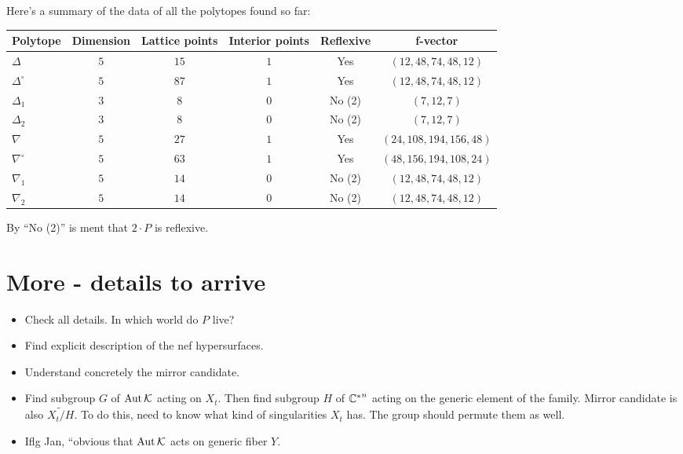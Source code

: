 \documentclass[11pt, english]{article}
\begin{document}
Here's a summary of the data of all the polytopes found so far:


\begin{center}
  \begin{tabular}{l| c c c c c}
Polytope & Dimension & Lattice points & Interior points & Reflexive & f-vector \\
\hline 
$\Delta$ & $5$ & $15$ & $1$ & Yes & $(12, 48, 74, 48, 12)$ \\
$\Delta^\circ$ & $5$ & $87$ & $1$ & Yes & $(12, 48, 74, 48, 12)$ \\
$\Delta_1$ & $3$ & $8$ & $0$ & No (2) & $(7, 12, 7)$ \\
$\Delta_2$ & $3$ & $8$ & $0$ & No (2) & $(7, 12, 7)$ \\
$\nabla$ & $5$ & $27$ & $1$ & Yes & $(24, 108, 194, 156, 48)$ \\
$\nabla^\circ$ & $5$ & $63$ & $1$ & Yes & $(48, 156, 194, 108, 24)$ \\
$\nabla_1$ & $5$ & $14$ & $0$ & No (2)& $(12, 48, 74, 48, 12)$ \\
$\nabla_2$ & $5$ & $14$ & $0$ & No (2)& $(12, 48, 74, 48, 12)$ \\
\end{tabular} 
\end{center} 
By ``No (2)'' is ment that $2 \cdot P$ is reflexive. 

\section{More - details to arrive}

\begin{itemize}
\item Check all details. In which world do $P$ live?
\item Find explicit description of the nef hypersurfaces.
\item Understand concretely the mirror candidate. 
\item Find subgroup $G$ of $\operatorname{Aut} \mathcal K$ acting on $X_t$. Then find subgroup $H$ of ${\mathbb{C}^\ast} ^n$ acting on the generic element of the family. Mirror candidate is also $\tilde{X_t/H}$. To do this, need to know what kind of singularities $X_t$ has. The group should permute them as well. 
\item Iflg Jan, ``obvious that $\operatorname{Aut} \mathcal K$ acts on generic fiber $Y$.
\end{itemize}

 

\end{document}
